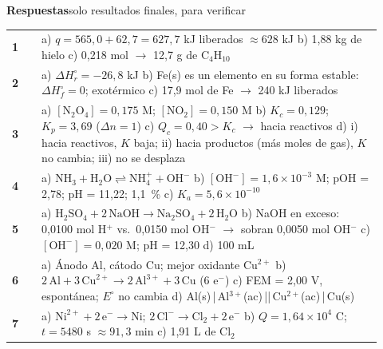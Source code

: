 \documentclass[11pt]{article}
\begin{document}
\newpage
{\Large\bfseries Respuestas}\hfill{\small\color{gray}solo resultados finales, para verificar}\par
\vspace{2pt}{\color{NavyBlue}\rule{\linewidth}{0.8pt}}\par\vspace{6pt}
\renewcommand{\arraystretch}{1.5}
\begin{tabular}{@{}>{\bfseries\color{NavyBlue}}l >{\raggedright\arraybackslash}p{0.92\linewidth}@{}}
1 & a) \(q = 565{,}0 + 62{,}7 = 627{,}7\) kJ liberados \(\approx 628\) kJ \quad b) 1,88 kg de hielo \quad c) 0,218 mol \(\rightarrow\) 12,7 g de C\(_4\)H\(_{10}\)\\
2 & a) \(\Delta H^\circ_r = -26{,}8\) kJ \quad b) Fe(s) es un elemento en su forma estable: \(\Delta H^\circ_f = 0\); exotérmico \quad c) 17,9 mol de Fe \(\rightarrow\) 240 kJ liberados\\
3 & a) \([\text{N}_2\text{O}_4] = 0{,}175\) M; \([\text{NO}_2] = 0{,}150\) M \quad b) \(K_c = 0{,}129\); \(K_p = 3{,}69\) (\(\Delta n = 1\)) \quad c) \(Q_c = 0{,}40 > K_c\) \(\rightarrow\) hacia reactivos \quad d) i) hacia reactivos, \(K\) baja; ii) hacia productos (más moles de gas), \(K\) no cambia; iii) no se desplaza\\
4 & a) \(\text{NH}_3 + \text{H}_2\text{O} \rightleftharpoons \text{NH}_4^+ + \text{OH}^-\) \quad b) \([\text{OH}^-] = 1{,}6\times10^{-3}\) M; pOH = 2,78; pH = 11,22; 1,1~\% \quad c) \(K_a = 5{,}6\times10^{-10}\)\\
5 & a) \(\text{H}_2\text{SO}_4 + 2\,\text{NaOH} \rightarrow \text{Na}_2\text{SO}_4 + 2\,\text{H}_2\text{O}\) \quad b) NaOH en exceso: 0,0100 mol H\(^+\) vs.\ 0,0150 mol OH\(^-\) \(\rightarrow\) sobran 0,0050 mol OH\(^-\) \quad c) \([\text{OH}^-] = 0{,}020\) M; pH = 12,30 \quad d) 100 mL\\
6 & a) Ánodo Al, cátodo Cu; mejor oxidante Cu\(^{2+}\) \quad b) \(2\,\text{Al} + 3\,\text{Cu}^{2+} \rightarrow 2\,\text{Al}^{3+} + 3\,\text{Cu}\) (6 e\(^-\)) \quad c) FEM = 2,00 V, espontánea; \(E^\circ\) no cambia \quad d) Al(s)\,|\,Al\(^{3+}\)(ac)\,||\,Cu\(^{2+}\)(ac)\,|\,Cu(s)\\
7 & a) \(\text{Ni}^{2+} + 2\,\text{e}^- \rightarrow \text{Ni}\); \(2\,\text{Cl}^- \rightarrow \text{Cl}_2 + 2\,\text{e}^-\) \quad b) \(Q = 1{,}64\times10^4\) C; \(t = 5480\) s \(\approx 91{,}3\) min \quad c) 1,91 L de Cl\(_2\)\\
\end{tabular}
\end{document}
